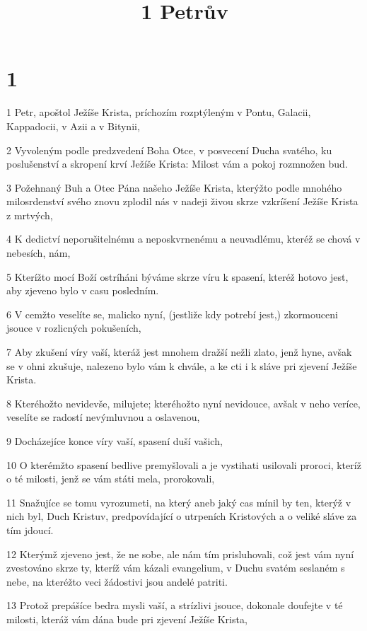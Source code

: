 

\title{1 Petrův}

\chapter{1}

\par 1 Petr, apoštol Ježíše Krista, príchozím rozptýleným v Pontu, Galacii, Kappadocii, v Azii a v Bitynii,
\par 2 Vyvoleným podle predzvedení Boha Otce, v posvecení Ducha svatého, ku poslušenství a skropení krví Ježíše Krista: Milost vám a pokoj rozmnožen bud.
\par 3 Požehnaný Buh a Otec Pána našeho Ježíše Krista, kterýžto podle mnohého milosrdenství svého znovu zplodil nás v nadeji živou skrze vzkríšení Ježíše Krista z mrtvých,
\par 4 K dedictví neporušitelnému a neposkvrnenému a neuvadlému, kteréž se chová v nebesích, nám,
\par 5 Kterížto mocí Boží ostríháni býváme skrze víru k spasení, kteréž hotovo jest, aby zjeveno bylo v casu posledním.
\par 6 V cemžto veselíte se, malicko nyní, (jestliže kdy potrebí jest,) zkormouceni jsouce v rozlicných pokušeních,
\par 7 Aby zkušení víry vaší, kteráž jest mnohem dražší nežli zlato, jenž hyne, avšak se v ohni zkušuje, nalezeno bylo vám k chvále, a ke cti i k sláve pri zjevení Ježíše Krista.
\par 8 Kteréhožto nevidevše, milujete; kteréhožto nyní nevidouce, avšak v neho veríce, veselíte se radostí nevýmluvnou a oslavenou,
\par 9 Docházejíce konce víry vaší, spasení duší vašich,
\par 10 O kterémžto spasení bedlive premyšlovali a je vystihati usilovali proroci, kteríž o té milosti, jenž se vám státi mela, prorokovali,
\par 11 Snažujíce se tomu vyrozumeti, na který aneb jaký cas mínil by ten, kterýž v nich byl, Duch Kristuv, predpovídající o utrpeních Kristových a o veliké sláve za tím jdoucí.
\par 12 Kterýmž zjeveno jest, že ne sobe, ale nám tím prisluhovali, což jest vám nyní zvestováno skrze ty, kteríž vám kázali evangelium, v Duchu svatém seslaném s nebe, na kteréžto veci žádostivi jsou andelé patriti.
\par 13 Protož prepášíce bedra mysli vaší, a strízlivi jsouce, dokonale doufejte v té milosti, kteráž vám dána bude pri zjevení Ježíše Krista,
